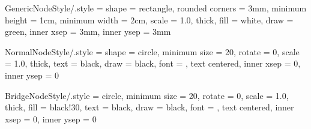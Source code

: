 \tikzset
{
	GenericNodeStyle/.style =
	{
		shape = rectangle,							%
		rounded corners	= 3mm,					%
		minimum height	= 1cm,					%
		minimum width	= 2cm,					%
		scale			= 1.0,					%
		thick,									%
		fill			= white,				%
		draw			= green,				%
		inner xsep		= 3mm,					%
		inner ysep		= 3mm					%
	}
}




\tikzset
{
	NormalNodeStyle/.style =
	{
		shape = circle,							%
		minimum size	= 20,					%
		rotate			= 0,					%
		scale			= 1.0,					%
		thick,									%
		text			= black,				%
		draw			= black,				%
		font			= \small,				%
		text centered,							%
		inner xsep		= 0,					%
		inner ysep		= 0						%
	}
}



\tikzset
{
	BridgeNodeStyle/.style =
	{
		circle,									%
		minimum size	= 20,					%
		rotate			= 0,					%
		scale			= 1.0,					%
		thick,									%
		fill			= black!30,				%
		text			= black,				%
		draw			= black,				%
		font			= \small,				%
		text centered,							%
		inner xsep		= 0,					%
		inner ysep		= 0						%
	}
}






